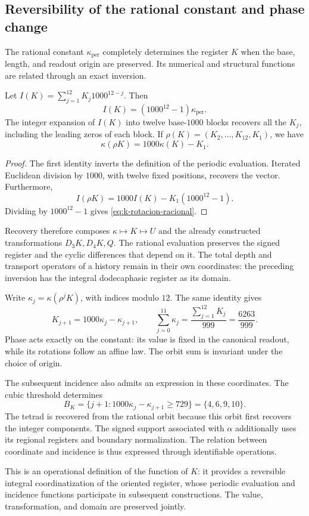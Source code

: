 \subsection{Reversibility of the rational constant and phase change}

The rational constant \(\kappa_{\mathrm{per}}\) completely determines
the register \(K\) when the base, length, and readout origin
are preserved. Its numerical and structural functions are related
through an exact inversion.

\begin{proposition}
Let \(I(K)=\sum_{j=1}^{12}K_j1000^{12-j}\). Then
\[
 I(K)=(1000^{12}-1)\kappa_{\mathrm{per}}.
\]
The integer expansion of \(I(K)\) into twelve base-\(1000\) blocks
recovers all the \(K_j\), including the leading zeros of each block.
If \(\rho(K)=(K_2,\ldots,K_{12},K_1)\), we have
\begin{equation}
 \kappa(\rho K)=1000\kappa(K)-K_1.
 \label{eq:k-rotacion-racional}
\end{equation}
\end{proposition}
\begin{proof}
The first identity inverts the definition of the periodic evaluation.
Iterated Euclidean division by \(1000\), with twelve fixed positions,
recovers the vector. Furthermore,
\[
 I(\rho K)=1000I(K)-K_1(1000^{12}-1).
\]
Dividing by \(1000^{12}-1\) gives \eqref{eq:k-rotacion-racional}.
\end{proof}

Recovery therefore composes \(\kappa\mapsto K\mapsto U\)
and the already constructed transformations \(D_3K,D_4K,Q\). The rational
evaluation preserves the signed register and the cyclic differences that
depend on it. The total depth and transport operators of
a history remain in their own coordinates: the preceding inversion
has the integral dodecaphasic register as its domain.

Write \(\kappa_j=\kappa(\rho^jK)\), with indices modulo \(12\).
The same identity gives
\[
 K_{j+1}=1000\kappa_j-\kappa_{j+1},\qquad
 \sum_{j=0}^{11}\kappa_j=\frac{\sum_{j=1}^{12}K_j}{999}
 =\frac{6263}{999}.
\]
Phase acts exactly on the constant: its value is fixed
in the canonical readout, while its rotations follow an affine law.
The orbit sum is invariant under the choice of origin.

The subsequent incidence also admits an expression in these
coordinates. The cubic threshold determines
\[
 B_K=\{j+1:1000\kappa_j-\kappa_{j+1}\ge729\}
 =\{4,6,9,10\}.
\]
The tetrad is recovered from the rational orbit because this orbit
first recovers the integer components. The signed support associated
with \(\alpha\) additionally uses its regional registers and boundary
normalization. The relation between coordinate and incidence is thus
expressed through identifiable operations.

This is an operational definition of the function of \(K\): it provides
a reversible integral coordinatization of the oriented register, whose
periodic evaluation and incidence functions participate in
subsequent constructions. The value, transformation, and domain
are preserved jointly.
